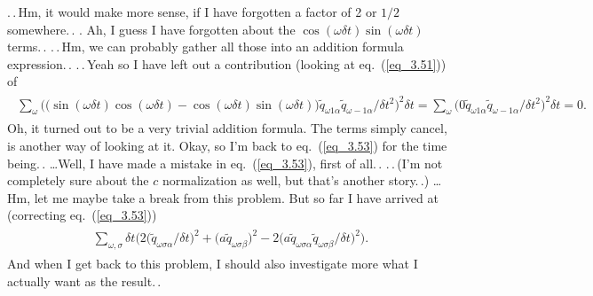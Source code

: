 \documentclass{report}
\begin{document}
.\,.\,Hm, it would make more sense, if I have forgotten a factor of 2 or $1/2$ somewhere.\,. %
.\,\,Ah, I guess I have forgotten about the $\cos(\omega \delta t)\sin(\omega \delta t)$ terms.\,. .\,.\,Hm, we can probably gather all those into an addition formula expression.\,. .\,.\,Yeah so I have left out a contribution (looking at eq.\ (\ref{eq_3.51})) of
\begin{align}
\begin{aligned}
	\sum_{\omega}
		\Big(
			\big(
				\sin(\omega\delta t) \cos(\omega\delta t) - 
				\cos(\omega\delta t) \sin(\omega\delta t)
			\big) \tilde q_{\omega 1\alpha} \tilde q_{\omega-1\alpha}  / \delta t^2 
		\Big)^2 
		\delta t =
	\sum_{\omega}
		\Big(
			0 \tilde q_{\omega 1\alpha} \tilde q_{\omega-1\alpha}  / \delta t^2 
		\Big)^2 
		\delta t = 0.
\end{aligned}
\end{align}
Oh, it turned out to be a very trivial addition formula. The terms simply cancel, is another way of looking at it. Okay, so I'm back to eq.\ (\ref{eq_3.53}) for the time being.\,. %
\ldots $\!$Well, I have made a mistake in eq.\ (\ref{eq_3.53}), first of all.\,. .\,.\,(I'm not completely sure about the $c$ normalization as well, but that's another story.\,.)
\ldots Hm, let me maybe take a break from this problem. But so far I have arrived at (correcting eq.\ (\ref{eq_3.53})) 
\begin{align}
\begin{aligned}
\sum_{\omega,\sigma} \delta t \bigg(
		2\big(
			\tilde q_{\omega\sigma\alpha}  / \delta t
		\big)^2 
		+
		\big(
			a \tilde q_{\omega\sigma\beta} 
		\big)^2 
		-
		2\big(
			a \tilde q_{\omega\sigma\alpha} \tilde q_{\omega\sigma\beta} / \delta t 
		\big)^2 
	\bigg).
\end{aligned}
\end{align}
And when I get back to this problem, I should also investigate more what I actually want as the result.\,. 
\end{document}
